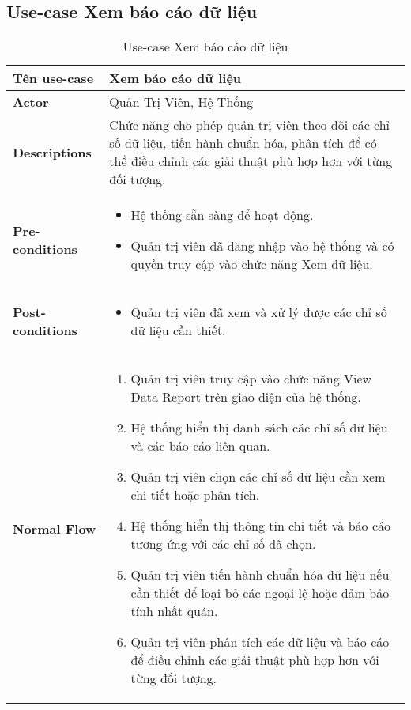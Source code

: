 \subsection{Use-case Xem báo cáo dữ liệu}
    \begin{longtable}[H]{|l|p{}|}
        \caption{Use-case Xem báo cáo dữ liệu}
        \\ \hline
        \textbf{Tên use-case} & Xem báo cáo dữ liệu\\
        \hline
        \textbf{Actor} & Quản Trị Viên, Hệ Thống \\
        \hline
        \textbf{Descriptions} & Chức năng cho phép quản trị viên theo dõi các chỉ số dữ liệu, tiến hành chuẩn hóa, phân tích để có thể điều chỉnh các giải thuật phù hợp hơn với từng đối tượng. \\
        \hline
        \textbf{Pre-conditions} & \vspace{-0.75cm} \begin{itemize}[leftmargin=4mm]
            \setlength\itemsep{0em}
            \item Hệ thống sẵn sàng để hoạt động.
            \item Quản trị viên đã đăng nhập vào hệ thống và có quyền truy cập vào chức năng Xem dữ liệu.
        \end{itemize} \\
        
        \hline

        \textbf{Post-conditions} & \vspace{-0.75cm} \begin{itemize}[leftmargin=4mm]
            \setlength\itemsep{0em}
            \item Quản trị viên đã xem và xử lý được các chỉ số dữ liệu cần thiết. 
        \end{itemize} \\
            
        \hline
        \textbf{Normal Flow} & \vspace{-0.75cm}
            \begin{enumerate}[leftmargin=5.5mm]
                \setlength\itemsep{0em}
                \item Quản trị viên truy cập vào chức năng View Data Report trên giao diện của hệ thống.
                \item Hệ thống hiển thị danh sách các chỉ số dữ liệu và các báo cáo liên quan.
                \item Quản trị viên chọn các chỉ số dữ liệu cần xem chi tiết hoặc phân tích.
                \item Hệ thống hiển thị thông tin chi tiết và báo cáo tương ứng với các chỉ số đã chọn. 
                \item Quản trị viên tiến hành chuẩn hóa dữ liệu nếu cần thiết để loại bỏ các ngoại lệ hoặc đảm bảo tính nhất quán.
                \item Quản trị viên phân tích các dữ liệu và báo cáo để điều chỉnh các giải thuật phù hợp hơn với từng đối tượng.
            \end{enumerate}\\
            

\end{longtable}
